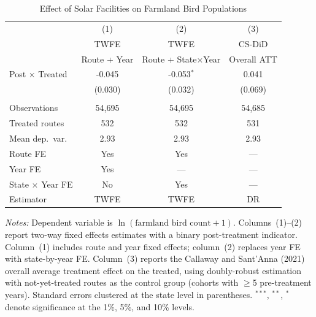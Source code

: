 \begin{table}[t]
\centering
\begin{threeparttable}
\caption{Effect of Solar Facilities on Farmland Bird Populations}
\label{tab:main}
\begin{tabular}{lccc}
\toprule
 & (1) & (2) & (3) \\
 & TWFE & TWFE & CS-DiD \\
 & Route + Year & Route + State$\times$Year & Overall ATT \\
\midrule
Post $\times$ Treated & -0.045 & -0.053$^{*}$ & 0.041 \\
 & (0.030) & (0.032) & (0.069) \\
\\[4pt]
Observations & 54,695 & 54,695 & 54,685 \\
Treated routes & 532 & 532 & 531 \\
Mean dep.\ var.\ & 2.93 & 2.93 & 2.93 \\
Route FE & Yes & Yes & --- \\
Year FE & Yes & --- & --- \\
State $\times$ Year FE & No & Yes & --- \\
Estimator & TWFE & TWFE & DR \\
\bottomrule
\end{tabular}
\begin{tablenotes}[flushleft]\small
\item \textit{Notes:} Dependent variable is $\ln(\text{farmland bird count} + 1)$. Columns~(1)--(2) report two-way fixed effects estimates with a binary post-treatment indicator. Column~(1) includes route and year fixed effects; column~(2) replaces year FE with state-by-year FE. Column~(3) reports the Callaway and Sant'Anna (2021) overall average treatment effect on the treated, using doubly-robust estimation with not-yet-treated routes as the control group (cohorts with $\geq$5 pre-treatment years). Standard errors clustered at the state level in parentheses. $^{***}$, $^{**}$, $^{*}$ denote significance at the 1\%, 5\%, and 10\% levels.
\end{tablenotes}
\end{threeparttable}
\end{table}

